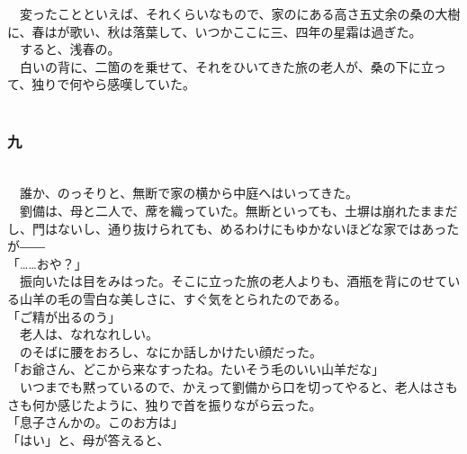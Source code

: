 \documentclass[
  paper=a5,
  fontsize=10pt,
  jafontsize=9.5pt,
  tate,                  %
  open_bracket_pos=nibu, %
]{jlreq}
\begin{document}
　変ったことといえば、それくらいなもので、家のにある高さ五丈余の桑の大樹に、春はが歌い、秋は落葉して、いつかここに三、四年の星霜は過ぎた。\\


　すると、浅春の。\\


　白いの背に、二箇のを乗せて、それをひいてきた旅の老人が、桑の下に立って、独りで何やら感嘆していた。\\

\\

\subsubsection{九}

\\


　誰か、のっそりと、無断で家の横から中庭へはいってきた。\\


　劉備は、母と二人で、蓆を織っていた。無断といっても、土塀は崩れたままだし、門はないし、通り抜けられても、めるわけにもゆかないほどな家ではあったが――\\


「……おや？」\\


　振向いたは目をみはった。そこに立った旅の老人よりも、酒瓶を背にのせている山羊の毛の雪白な美しさに、すぐ気をとられたのである。\\


「ご精が出るのう」\\


　老人は、なれなれしい。\\


　のそばに腰をおろし、なにか話しかけたい顔だった。\\


「お爺さん、どこから来なすったね。たいそう毛のいい山羊だな」\\


　いつまでも黙っているので、かえって劉備から口を切ってやると、老人はさもさも何か感じたように、独りで首を振りながら云った。\\


「息子さんかの。このお方は」\\


「はい」と、母が答えると、\\
\end{document}
